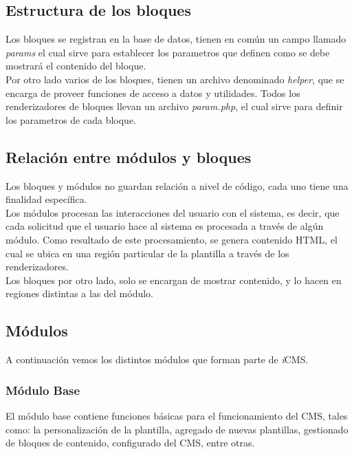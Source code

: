 \subsection{Estructura de los bloques}
Los bloques se registran en la base de datos, tienen en com\'un un campo llamado \textit{params} el cual sirve para establecer los parametros que definen como se debe mostrar\'a el contenido del bloque.\\
Por otro lado varios de los bloques, tienen un archivo denominado \textit{helper}, que se encarga de proveer funciones de acceso a datos y utilidades.
Todos los renderizadores de bloques llevan un archivo \textit{param.php}, el cual sirve para definir los parametros de cada bloque.

\subsection{Relaci\'on entre m\'odulos y bloques}
Los bloques y m\'odulos no guardan relaci\'on a nivel de c\'odigo, cada uno tiene una finalidad espec\'ifica.\\
Los m\'odulos procesan las interacciones del usuario con el sistema, es decir, que cada solicitud que el usuario hace al sistema es procesada a trav\'es de alg\'un m\'odulo. Como resultado de este procesamiento, se genera contenido HTML, el cual se ubica en una regi\'on particular de la plantilla a trav\'es de los renderizadores.\\
Los bloques por otro lado, solo se encargan de mostrar contenido, y lo hacen en regiones distintas a las del m\'odulo.

\subsection{M\'odulos}
A continuaci\'on vemos los distintos m\'odulos que forman parte de \textit{i}CMS.

\subsubsection{M\'odulo Base}
El m\'odulo base contiene funciones b\'asicas para el funcionamiento del CMS, tales como: la personalizaci\'on de la plantilla, agregado de nuevas plantillas, gestionado de bloques de contenido, configurado del CMS, entre otras.

